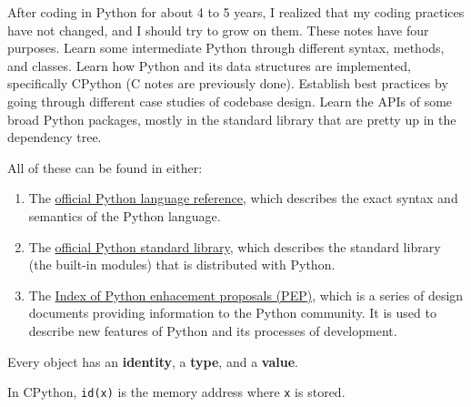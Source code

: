 After coding in Python for about 4 to 5 years, I realized that my coding practices have not changed, and I should try to grow on them. These notes have four purposes. Learn some intermediate Python through different syntax, methods, and classes. Learn how Python and its data structures are implemented, specifically CPython (C notes are previously done). Establish best practices by going through different case studies of codebase design. Learn the APIs of some broad Python packages, mostly in the standard library that are pretty up in the dependency tree. 

All of these can be found in either: 
\begin{enumerate}
  \item The \href{https://docs.python.org/3/reference}{official Python language reference}, which describes the exact syntax and semantics of the Python language. 
  \item The \href{https://docs.python.org/3/library/index.html}{official Python standard library}, which describes the standard library (the built-in modules) that is distributed with Python. 
  \item The \href{https://peps.python.org/}{Index of Python enhacement proposals (PEP)}, which is a series of design documents providing information to the Python community. It is used to describe new features of Python and its processes of development. 
\end{enumerate}

\begin{definition}[Object]
  \label{def:object}
  Every object has an \textbf{identity}, a \textbf{type}, and a \textbf{value}. 
\end{definition}

\begin{theorem}[]
  \label{thm:cpython-memory-address-stored}
  In CPython, \texttt{id(x)} is the memory address where \texttt{x} is stored. 
\end{theorem}
